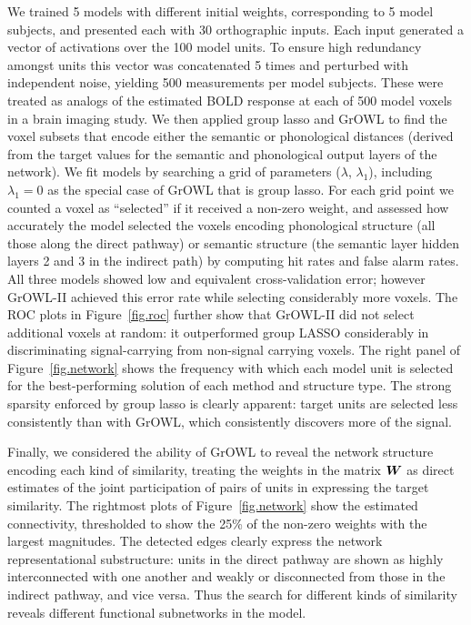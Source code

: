 We trained 5 models with different initial weights, corresponding to 5 model subjects, and
presented each with 30 orthographic inputs. Each input generated a vector of activations
over the 100 model units. To ensure high redundancy amongst units this vector was
concatenated 5 times and perturbed with independent noise, yielding 500 measurements per
model subjects. These were treated as analogs of the estimated BOLD response at each of 500
model voxels in a brain imaging study. We then applied group lasso and GrOWL to find the
voxel subsets that encode either the semantic or phonological distances (derived from the
target values for the semantic and phonological output layers of the network). We fit
models by searching a grid of parameters ($\lambda$, $\lambda_1$), including $\lambda_1=0$
as the special case of GrOWL that is group lasso. For each grid point we counted a voxel as
``selected'' if it received a non-zero weight, and assessed how accurately the model
selected  the voxels encoding phonological structure (all those along the direct pathway)
or semantic structure (the semantic layer hidden layers 2 and 3 in the indirect path) by
computing hit rates and false alarm rates. All three models showed low and equivalent
cross-validation error; however GrOWL-II achieved this error rate while selecting
considerably more voxels. The ROC plots in Figure~\ref{fig.roc} further show that GrOWL-II
did not select additional voxels at random: it outperformed group LASSO considerably in
discriminating signal-carrying from non-signal carrying voxels. The right panel of
Figure~\ref{fig.network} shows the frequency with which each model unit is selected for the
best-performing solution of each method and structure type. The strong sparsity enforced by
group lasso is clearly apparent: target units are selected less consistently than with
GrOWL, which consistently discovers more of the signal.

Finally, we considered the ability of GrOWL to reveal the network structure encoding each
kind of similarity, treating the weights in the matrix $\boldsymbol{W}$ as direct estimates of the
joint participation of pairs of units in expressing the target similarity. The rightmost
plots of Figure~\ref{fig.network} show the estimated connectivity, thresholded to show the
25\% of the non-zero weights with the largest magnitudes. The detected edges clearly
express the network representational substructure: units in the direct pathway are shown as
highly interconnected with one another and weakly or disconnected from those in the
indirect pathway, and vice versa. Thus the search for different kinds of similarity reveals
different functional subnetworks in the model.

